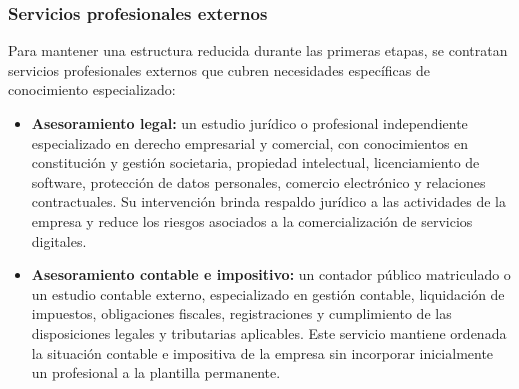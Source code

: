 \subsubsection{Servicios profesionales externos}
Para mantener una estructura reducida durante las primeras etapas, se contratan servicios profesionales externos que cubren necesidades específicas de conocimiento especializado:
\begin{itemize}
  \item \textbf{Asesoramiento legal:} un estudio jurídico o profesional independiente especializado en derecho empresarial y comercial, con conocimientos en constitución y gestión societaria, propiedad intelectual, licenciamiento de software, protección de datos personales, comercio electrónico y relaciones contractuales. Su intervención brinda respaldo jurídico a las actividades de la empresa y reduce los riesgos asociados a la comercialización de servicios digitales.
  \item \textbf{Asesoramiento contable e impositivo:} un contador público matriculado o un estudio contable externo, especializado en gestión contable, liquidación de impuestos, obligaciones fiscales, registraciones y cumplimiento de las disposiciones legales y tributarias aplicables. Este servicio mantiene ordenada la situación contable e impositiva de la empresa sin incorporar inicialmente un profesional a la plantilla permanente.
\end{itemize}

